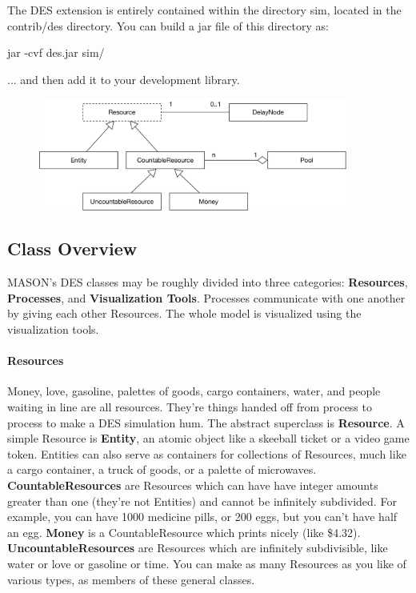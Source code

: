 \documentclass[twoside,10pt]{article}
\newcommand\file[1]{\textsf{#1}}
\newcommand\code[1]{\textsf{#1}}
\begin{document}
The DES extension is entirely contained within the directory \file{sim}, located in the \file{contrib/des} directory.  You can build a jar file of this directory as:

\code{jar -cvf des.jar sim/}

... and then add it to your development library.

\begin{figure}[t]
\centering\includegraphics[width=4in]{Resources.pdf}
\end{figure}

\subsection{Class Overview}

MASON's DES classes may be roughly divided into three categories: {\bf Resources}, {\bf Processes}, and {\bf Visualization Tools}.  Processes communicate with one another by giving each other Resources.  The whole model is visualized using the visualization tools.

\paragraph{Resources}  Money, love, gasoline, palettes of goods, cargo containers, water, and people waiting in line are all resources.  They're things handed off from process to process to make a DES simulation hum.  The abstract superclass is {\bf Resource}.   A simple Resource is {\bf Entity}, an atomic object like a skeeball ticket or a video game token.  Entities can also serve as containers for collections of Resources, much like a cargo container, a truck of goods, or a palette of microwaves.  {\bf CountableResources} are Resources which can have have integer amounts greater than one (they're not Entities) and cannot be infinitely subdivided.  For example, you can have 1000 medicine pills, or 200 eggs, but you can't have half an egg.  {\bf Money} is a CountableResource which prints nicely (like \$4.32).  {\bf UncountableResources} are Resources which are infinitely subdivisible, like water or love or gasoline or time.  You can make as many Resources as you like of various types, as members of these general classes.
\end{document}

